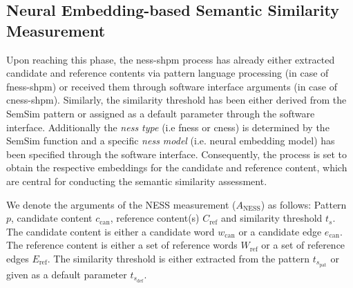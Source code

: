 \documentclass[11pt, numbers=noenddot]{scrreprt}
\begin{document}
%
%


\subsection{Neural Embedding-based Semantic Similarity Measurement}
\label{sec:neural-embedding-based-semantic-similarity-measurement}
Upon reaching this phase, the \gls{ness-shpm} process has already either extracted candidate and reference contents via pattern language processing (in case of \gls{fness-shpm}) or received them through software interface arguments (in case of \gls{cness-shpm}). Similarly, the similarity threshold has been either derived from the SemSim pattern or assigned as a default parameter through the software interface. Additionally the \textit{\gls{ness} type} (i.e \gls{fness} or \gls{cness}) is determined by the SemSim function and a specific \textit{\gls{ness} model} (i.e. neural embedding model) has been specified through the software interface. Consequently, the process is set to obtain the respective embeddings for the candidate and reference content, which are central for conducting the semantic similarity assessment.

We denote the arguments of the NESS measurement (\(A_\text{NESS}\)) as follows:
Pattern \(p\), candidate content \(c_\text{can}\), reference content(s) \(C_\text{ref}\) and similarity threshold \(t_s\). The candidate content is either a candidate word \(w_\text{can}\) or a candidate edge \(e_\text{can}\). The reference content is either a set of reference words \(W_\text{ref}\) or a set of reference edges \(E_\text{ref}\). The similarity threshold is either extracted from the pattern \(t_{s_\text{pat}}\) or given as a default parameter \(t_{s_\text{def}}\).
\end{document}
